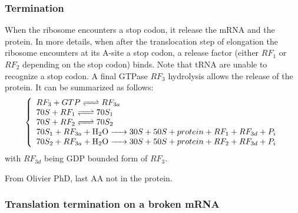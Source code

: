 

\subsubsection{Termination}
When the ribosome encounters a stop codon, it release the mRNA and the protein. In more details, when after the translocation step of elongation the ribosome encounters at its A-site a stop codon, a release factor (either $RF_1$ or $RF_2$ depending on the stop codon) binds. Note that tRNA are unable to recognize a stop codon. A final GTPase $RF_3$ hydrolysis allows the release of the protein. It can be summarized as follows:
$$
  \left\{
    \begin{array}{l}
      \reactionRev{RF_3 + GTP}{RF_{3a}}{}{} \\
      \reactionRev{70S + RF_1}{70S_1}{}{} \\
      \reactionRev{70S + RF_2}{70S_2}{}{} \\
      \reactionIrr{70S_1 + RF_{3a} + \ce{H2O}}{30S + 50S + protein + RF_1 + RF_{3d} + P_i}{}{} \\
      \reactionIrr{70S_2 + RF_{3a} + \ce{H2O}}{30S + 50S + protein + RF_2 + RF_{3d} + P_i}{}{} \\
    \end{array}
  \right.
$$
with $RF_{3d}$ being GDP bounded form of $RF_3$.

\textcolor[rgb]{1.00,0.00,0.00}{From Olivier PhD, last AA not in the protein.}



\subsubsection{Translation termination on a broken mRNA} \label{sec:stalledTranslation}

